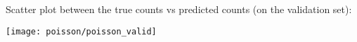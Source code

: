 \begin{answer}
\graphicspath{ {./poisson/} }

Scatter plot between the true counts vs predicted counts (on the validation set):

\texttt{[image: poisson/poisson\_valid]}
\end{answer}
